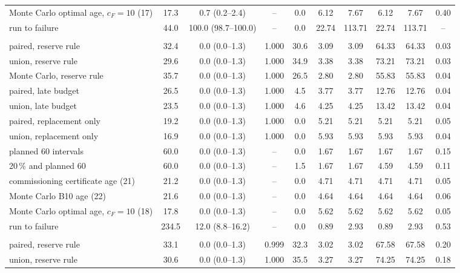 \begin{table}[htbp]
\begin{tabular*}{\textwidth}{@{\extracolsep{\fill}}lccccccccc@{}}
Monte Carlo optimal age, $c_F=10$ (17) & 17.3 & 0.7 (0.2--2.4) & -- & 0.0 & 6.12 & 7.67 & 6.12 & 7.67 & 0.40 \\
run to failure & 44.0 & 100.0 (98.7--100.0) & -- & 0.0 & 22.74 & 113.71 & 22.74 & 113.71 & -- \\
\addlinespace
\multicolumn{10}{@{}l}{\textit{evidence, coasting}} \\
paired, reserve rule & 32.4 & 0.0 (0.0--1.3) & 1.000 & 30.6 & 3.09 & 3.09 & 64.33 & 64.33 & 0.03 \\
union, reserve rule & 29.6 & 0.0 (0.0--1.3) & 1.000 & 34.9 & 3.38 & 3.38 & 73.21 & 73.21 & 0.03 \\
Monte Carlo, reserve rule & 35.7 & 0.0 (0.0--1.3) & 1.000 & 26.5 & 2.80 & 2.80 & 55.83 & 55.83 & 0.04 \\
paired, late budget & 26.5 & 0.0 (0.0--1.3) & 1.000 & 4.5 & 3.77 & 3.77 & 12.76 & 12.76 & 0.04 \\
union, late budget & 23.5 & 0.0 (0.0--1.3) & 1.000 & 4.6 & 4.25 & 4.25 & 13.42 & 13.42 & 0.04 \\
paired, replacement only & 19.2 & 0.0 (0.0--1.3) & 1.000 & 0.0 & 5.21 & 5.21 & 5.21 & 5.21 & 0.05 \\
union, replacement only & 16.9 & 0.0 (0.0--1.3) & 1.000 & 0.0 & 5.93 & 5.93 & 5.93 & 5.93 & 0.04 \\
planned 60 intervals & 60.0 & 0.0 (0.0--1.3) & -- & 0.0 & 1.67 & 1.67 & 1.67 & 1.67 & 0.15 \\
20\,\% and planned 60 & 60.0 & 0.0 (0.0--1.3) & -- & 1.5 & 1.67 & 1.67 & 4.59 & 4.59 & 0.11 \\
commissioning certificate age (21) & 21.2 & 0.0 (0.0--1.3) & -- & 0.0 & 4.71 & 4.71 & 4.71 & 4.71 & 0.05 \\
Monte Carlo B10 age (22) & 21.6 & 0.0 (0.0--1.3) & -- & 0.0 & 4.64 & 4.64 & 4.64 & 4.64 & 0.06 \\
Monte Carlo optimal age, $c_F=10$ (18) & 17.8 & 0.0 (0.0--1.3) & -- & 0.0 & 5.62 & 5.62 & 5.62 & 5.62 & 0.05 \\
run to failure & 234.5 & 12.0 (8.8--16.2) & -- & 0.0 & 0.89 & 2.93 & 0.89 & 2.93 & 0.53 \\
\addlinespace
\multicolumn{10}{@{}l}{\textit{adverse, coasting}} \\
paired, reserve rule & 33.1 & 0.0 (0.0--1.3) & 0.999 & 32.3 & 3.02 & 3.02 & 67.58 & 67.58 & 0.20 \\
union, reserve rule & 30.6 & 0.0 (0.0--1.3) & 1.000 & 35.5 & 3.27 & 3.27 & 74.25 & 74.25 & 0.18 \\

\end{tabular*}
\end{table}
